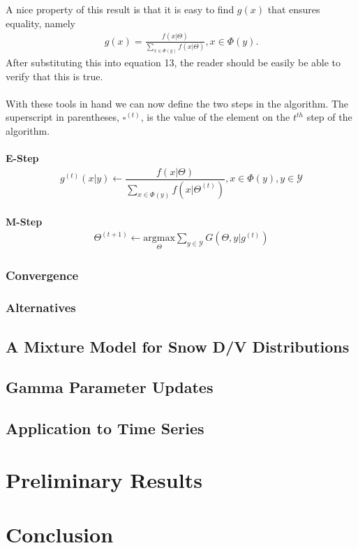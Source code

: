 \documentclass[10pt,a4paper]{article}
\newcommand{\given}{\vert}
\begin{document}
A nice property of this result is that it is easy to find $g(x)$ that ensures equality, namely
\begin{align}
g(x) = \frac{ f(x \given \Theta) }{ \sum_{x \in \Phi(y)} f(x \given \Theta) }, x \in \Phi(y).
\end{align} 
After substituting this into equation 13, the reader should be easily be able to verify that this is true. 
\\\\
With these tools in hand we can now define the two steps in the algorithm. The superscript in parentheses, $\square^{(t)}$, is the value of the element on the $t^{th}$ step of the algorithm.
\\\\
\textbf{E-Step}
\begin{align}
g^{(t)}(x \given y) \gets \dfrac{ f(x \given \Theta) }{ \sum_{x \in \Phi(y)} f(x \given \Theta^{(t)}) }, x \in \Phi(y), y \in \mathcal{Y}
\end{align}
\\
\textbf{M-Step}
\begin{align}
	\Theta^{(t+1)} \gets \underset{\Theta}{\text{argmax}}{\displaystyle{\sum_{y \in \mathcal{Y}}G(\Theta, y \given g^{(t)})}}
\end{align}

\subsubsection{Convergence}

\subsubsection{Alternatives}
\subsection{A Mixture Model for Snow D/V Distributions}
\subsection{Gamma Parameter Updates}
\subsection{Application to Time Series}
\section{Preliminary Results}
\section{Conclusion}
\end{document}
